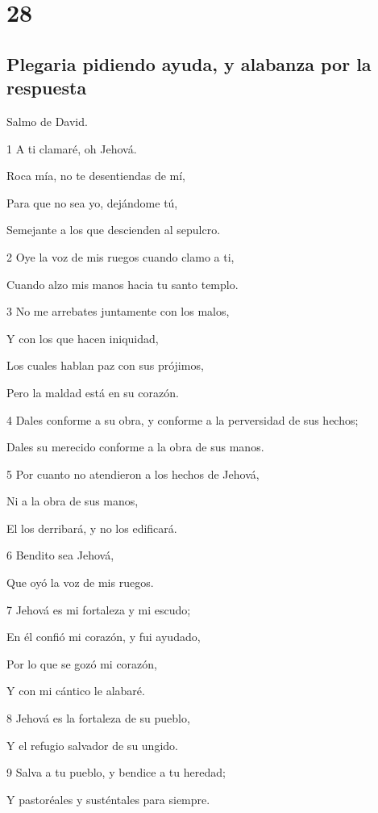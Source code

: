 \chapter{28}

\section*{Plegaria pidiendo ayuda, y alabanza por la respuesta}

\par Salmo de David.

\par 1 A ti clamaré, oh Jehová.
\par Roca mía, no te desentiendas de mí,
\par Para que no sea yo, dejándome tú,
\par Semejante a los que descienden al sepulcro.
\par 2 Oye la voz de mis ruegos cuando clamo a ti,
\par Cuando alzo mis manos hacia tu santo templo.
\par 3 No me arrebates juntamente con los malos,
\par Y con los que hacen iniquidad,
\par Los cuales hablan paz con sus prójimos,
\par Pero la maldad está en su corazón.
\par 4 Dales conforme a su obra, y conforme a la perversidad de sus hechos;
\par Dales su merecido conforme a la obra de sus manos.
\par 5 Por cuanto no atendieron a los hechos de Jehová,
\par Ni a la obra de sus manos,
\par El los derribará, y no los edificará.
\par 6 Bendito sea Jehová,
\par Que oyó la voz de mis ruegos.
\par 7 Jehová es mi fortaleza y mi escudo;
\par En él confió mi corazón, y fui ayudado,
\par Por lo que se gozó mi corazón,
\par Y con mi cántico le alabaré.
\par 8 Jehová es la fortaleza de su pueblo,
\par Y el refugio salvador de su ungido.
\par 9 Salva a tu pueblo, y bendice a tu heredad;
\par Y pastoréales y susténtales para siempre.

